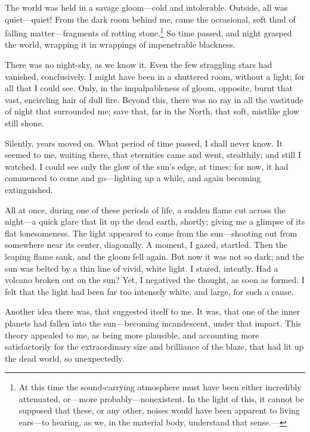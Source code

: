 
\clearpage
\label{ch:12}

\begin{ChapterStart}
\null\null
{}
\end{ChapterStart}

The world was held in a savage gloom---cold and intolerable. Outside, all was quiet---quiet! From the dark room behind me, came the occasional, soft thud of falling matter---fragments of rotting stone.\footnote{At this time the sound-carrying atmosphere must have been either incredibly attenuated, or---more probably---nonexistent. In the light of this, it cannot be supposed that these, or any other, noises would have been apparent to living ears---to hearing, as we, in the material body, understand that sense.---} So time passed, and night grasped the world, wrapping it in wrappings of impenetrable blackness.

There was no night-sky, as we know it. Even the few straggling stars had vanished, conclusively. I might have been in a shuttered room, without a light; for all that I could see. Only, in the impalpableness of gloom, opposite, burnt that vast, encircling hair of dull fire. Beyond this, there was no ray in all the vastitude of night that surrounded me; save that, far in the North, that soft, mistlike glow still shone.

Silently, years moved on. What period of time passed, I shall never know. It seemed to me, waiting there, that eternities came and went, stealthily; and still I watched. I could see only the glow of the sun’s edge, at times; for now, it had commenced to come and go---lighting up a while, and again becoming extinguished.

All at once, during one of these periods of life, a sudden flame cut across the night---a quick glare that lit up the dead earth, shortly; giving me a glimpse of its flat lonesomeness. The light appeared to come from the sun---shooting out from somewhere near its center, diagonally. A moment, I gazed, startled. Then the leaping flame sank, and the gloom fell again. But now it was not so dark; and the sun was belted by a thin line of vivid, white light. I stared, intently. Had a volcano broken out on the sun? Yet, I negatived the thought, as soon as formed. I felt that the light had been far too intensely white, and large, for such a cause.

Another idea there was, that suggested itself to me. It was, that one of the inner planets had fallen into the sun---becoming incandescent, under that impact. This theory appealed to me, as being more plausible, and accounting more satisfactorily for the extraordinary size and brilliance of the blaze, that had lit up the dead world, so unexpectedly.

